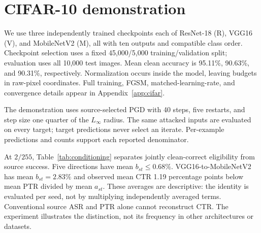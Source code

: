 \documentclass[10pt,twocolumn]{article}
\begin{document}
\section{CIFAR-10 demonstration}
We use three independently trained checkpoints each of ResNet-18 (R), VGG16 (V), and MobileNetV2 (M), all with ten outputs and compatible class order. Checkpoint selection uses a fixed 45,000/5,000 training/validation split; evaluation uses all 10,000 test images. Mean clean accuracy is 95.11\%, 90.63\%, and 90.31\%, respectively. Normalization occurs inside the model, leaving budgets in raw-pixel coordinates. Full training, FGSM, matched-learning-rate, and convergence details appear in Appendix~\ref{app:cifar}.

The demonstration uses source-selected PGD with 40 steps, five restarts, and step size one quarter of the $L_\infty$ radius. The same attacked inputs are evaluated on every target; target predictions never select an iterate. Per-example predictions and counts support each reported denominator.

At $2/255$, Table~\ref{tab:conditioning} separates jointly clean-correct eligibility from source success. Five directions have mean $b_{st}\leq0.68\%$. VGG16-to-MobileNetV2 has mean $b_{st}=2.83\%$ and observed mean CTR 1.19 percentage points below mean PTR divided by mean $a_{st}$. These averages are descriptive: the identity is evaluated per seed, not by multiplying independently averaged terms. Conventional source ASR and PTR alone cannot reconstruct CTR. The experiment illustrates the distinction, not its frequency in other architectures or datasets.
\end{document}
